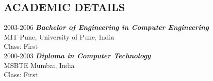 \documentclass[line, margin]{res}
\begin{document}
\address{8562 Mill Farm Ct Apt-F \\ Indianapolis, IN 46227 \\ +1(317) 970 2178}
\address{bipinbachhao@gmail.com, https://www.linkedin.com/in/bipin-bachhao-8b39b24}


\begin{resume}

\section{ACADEMIC DETAILS}
2003-2006 \textbf{\textit{Bachelor of Engineering in Computer Engineering}}\\
MIT Pune, University of Pune, India\\
Class: First\\
2000-2003 \textbf{\textit{Diploma in Computer Technology}}\\
MSBTE Mumbai, India\\
Class: First


\end{resume}
\end{document}

